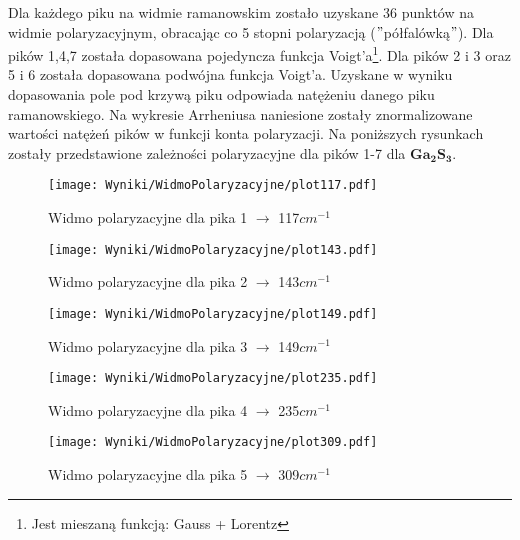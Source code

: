 Dla każdego piku na widmie ramanowskim zostało uzyskane 36 punktów na widmie polaryzacyjnym, obracając co 5 stopni polaryzacją ($"$półfalówką$"$). Dla pików 1,4,7 została dopasowana pojedyncza funkcja Voigt'a\footnote{Jest mieszaną funkcją: Gauss + Lorentz}. Dla pików 2 i 3 oraz 5 i 6 została dopasowana podwójna funkcja Voigt'a. Uzyskane w wyniku dopasowania pole pod krzywą piku odpowiada natężeniu danego piku ramanowskiego. Na wykresie Arrheniusa naniesione zostały znormalizowane wartości natężeń pików w funkcji konta polaryzacji. Na poniższych rysunkach zostały przedstawione zależności polaryzacyjne dla pików 1-7 dla $\mathbf{Ga_{2}S_{3}}$.

\begin{figure}[H]
	\begin{center}
		\texttt{[image: Wyniki/WidmoPolaryzacyjne/plot117.pdf]}
		\caption{Widmo polaryzacyjne dla pika 1 $\rightarrow$ 117$cm^{-1}$ }
	\end{center}
\end{figure}

\begin{figure}[H]
	\begin{center}
		\texttt{[image: Wyniki/WidmoPolaryzacyjne/plot143.pdf]}
		\caption{Widmo polaryzacyjne dla pika 2 $\rightarrow$ 143$cm^{-1}$ }
	\end{center}
\end{figure}

\begin{figure}[H]
	\begin{center}
		\texttt{[image: Wyniki/WidmoPolaryzacyjne/plot149.pdf]}
		\caption{Widmo polaryzacyjne dla pika 3 $\rightarrow$ 149$cm^{-1}$ }
	\end{center}
\end{figure}

\begin{figure}[H]
	\begin{center}
		\texttt{[image: Wyniki/WidmoPolaryzacyjne/plot235.pdf]}
		\caption{Widmo polaryzacyjne dla pika 4 $\rightarrow$ 235$cm^{-1}$ }
	\end{center}
\end{figure}

\begin{figure}[H]
	\begin{center}
		\texttt{[image: Wyniki/WidmoPolaryzacyjne/plot309.pdf]}
		\caption{Widmo polaryzacyjne dla pika 5 $\rightarrow$ 309$cm^{-1}$ }
	\end{center}
\end{figure}

